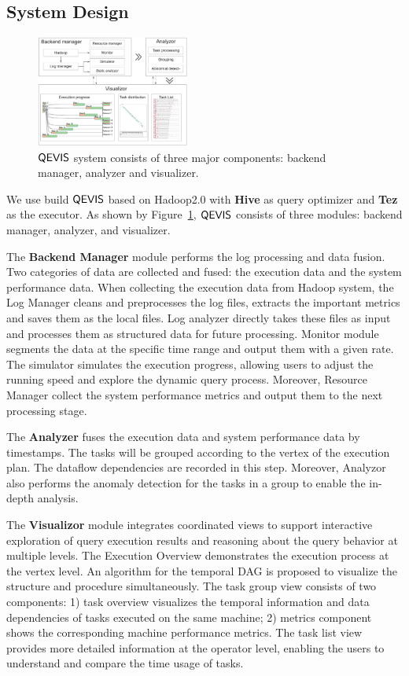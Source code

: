 \subsection{System Design}
\begin{figure}[t]
	\centering
	\includegraphics[width=0.45\textwidth]{figures/system/sysdesign.pdf}
	\vspace{-3mm}
	\caption{$\mathsf{QEVIS}$ system consists of three major components: backend manager, analyzer and visualizer.}
	\label{fig:sysdesign}
	\vspace{-3mm}
\end{figure}
We use build $\mathsf{QEVIS}$ based on Hadoop2.0 with \textbf{Hive} as query optimizer and \textbf{Tez} as the executor. As shown by Figure~\ref{fig:sysdesign}, $\mathsf{QEVIS}$ consists of three modules: backend manager, analyzer, and visualizer. 


The \textbf{Backend Manager} module performs the log processing and data fusion. Two categories of data are collected and fused: the execution data and the system performance data.
When collecting the execution data from Hadoop system, the Log Manager cleans and preprocesses the log files, extracts the important metrics and saves them as the local files.
Log analyzer directly takes these files as input and processes them as structured data for future processing.
Monitor module segments the data at the specific time range and output them with a given rate.
The simulator simulates the execution progress, allowing users to adjust the running speed and explore the dynamic query process.
Moreover, Resource Manager collect the system performance metrics and output them to the next processing stage.


The \textbf{Analyzer} fuses the execution data and system performance data by timestamps. The tasks will be grouped according to the vertex of the execution plan. The dataflow dependencies are recorded in this step. Moreover, Analyzor also performs the anomaly detection for the tasks in a group to enable the in-depth analysis.


The \textbf{Visualizor} module integrates coordinated views to support interactive exploration of query execution results and reasoning about the query behavior at multiple levels. The Execution Overview demonstrates the execution process at the vertex level. An algorithm for the temporal DAG is proposed to visualize the structure and procedure simultaneously. The task group view consists of two components: 1) task overview visualizes the temporal information and data dependencies of tasks executed on the same machine; 2) metrics component shows the corresponding machine performance metrics. The task list view provides more detailed information at the operator level, enabling the users to understand and compare the time usage of tasks. 

